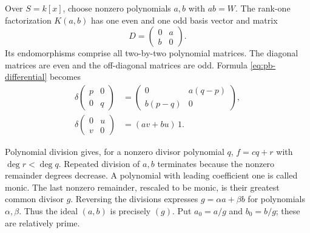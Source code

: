 Over \(S=k[x]\), choose nonzero polynomials \(a,b\) with \(ab=W\).
The rank-one factorization \(K(a,b)\) has one even and one odd basis
vector and matrix
\[
 D=\begin{pmatrix}0&a\\ b&0\end{pmatrix}.
\]
Its endomorphisms comprise all two-by-two polynomial matrices.
The diagonal matrices are even and the off-diagonal matrices are odd.
Formula \eqref{eq:pb-differential} becomes
\begin{align}
 \delta\begin{pmatrix}p&0\\0&q\end{pmatrix}
  &=\begin{pmatrix}0&a(q-p)\\b(p-q)&0\end{pmatrix},
  \label{eq:pb-even-differential}\\
 \delta\begin{pmatrix}0&u\\v&0\end{pmatrix}
  &=(av+bu)\,1.
  \label{eq:pb-odd-differential}
\end{align}

Polynomial division gives, for a nonzero divisor polynomial \(q\),
\(f=cq+r\) with \(\deg r<\deg q\). Repeated division of \(a,b\)
terminates because the nonzero remainder degrees decrease. A
polynomial with leading coefficient one is called monic. The last
nonzero remainder, rescaled to be monic, is their
greatest common divisor \(g\). Reversing the divisions expresses
\(g=\alpha a+\beta b\) for polynomials \(\alpha,\beta\). Thus
the ideal \((a,b)\) is precisely \((g)\). Put
\(a_0=a/g\) and \(b_0=b/g\); these are relatively prime.

